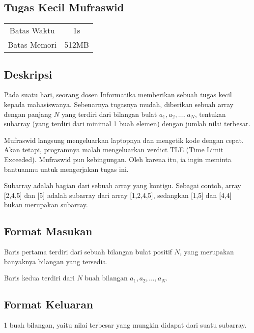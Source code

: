 \documentclass{article}
\begin{document}
\begin{center}
    \section*{Tugas Kecil Mufraswid} %

    \begin{tabular}{ | c c | }
        \hline
        Batas Waktu  & 1s \\    %
        Batas Memori & 512MB \\  %
        \hline
    \end{tabular}
\end{center}

\subsection*{Deskripsi}

Pada suatu hari, seorang dosen Informatika memberikan sebuah tugas kecil kepada mahasiswanya. Sebenarnya tugasnya mudah, diberikan sebuah array dengan panjang $N$ yang terdiri dari bilangan bulat $a_1, a_2, ..., a_N$, tentukan subarray (yang terdiri dari minimal 1 buah elemen) dengan jumlah nilai terbesar.
\par
Mufraswid langsung mengeluarkan laptopnya dan mengetik kode dengan cepat. Akan tetapi, programnya malah mengeluarkan verdict TLE (Time Limit Exceeded). Mufraswid pun kebingungan. Oleh karena itu, ia ingin meminta bantuanmu untuk mengerjakan tugas ini.
\par
Subarray adalah bagian dari sebuah array yang kontigu. Sebagai contoh, array [2,4,5] dan [5] adalah subarray dari array [1,2,4,5], sedangkan [1,5] dan [4,4] bukan merupakan subarray.

\subsection*{Format Masukan}

Baris pertama terdiri dari sebuah bilangan bulat positif $N$, yang merupakan banyaknya bilangan yang tersedia.
\par
Baris kedua terdiri dari $N$ buah bilangan $a_1, a_2, ..., a_N$.

\subsection*{Format Keluaran}

1 buah bilangan, yaitu nilai terbesar yang mungkin didapat dari suatu subarray.
\end{document}
